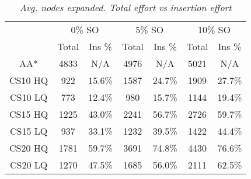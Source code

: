 \begin{table}[ht]
\caption{\small{\emph{Avg. nodes expanded. Total effort vs insertion effort}}}
\label{aha-table:searcheffort}
\begin{center}
\begin{tabular*}{0.48\textwidth}{@{\extracolsep{\fill}}ccccccc}%
  \hline
 & \multicolumn{2}{c}{\small{0\% SO}} & \multicolumn{2}{c}{\small{5\% SO}} & \multicolumn{2}{c}{\small{10\% SO}} \\
 & \small{Total} & \small{Ins \%} & \small{Total} & \small{Ins \%} & \small{Total} & \small{Ins \%} \\
  \hline
\small{AA*} & \small{4833 }& \small{N/A }& \small{4976 }& \small{N/A }& \small{5021} & \small{N/A }\\
\small{CS10 HQ }& \small{922 }& \small{15.6\%} & \small{1587} & \small{24.7\% }& \small{1909 }& \small{27.7\% }\\
\small{CS10 LQ }& \small{773 }& \small{12.4\% }& \small{980 }& \small{15.7\% }& \small{1144 }& \small{19.4\% }\\
\small{CS15 HQ }& \small{1225 }& \small{43.0\%} & \small{2241 }& \small{56.7\% }& \small{2726 }& \small{59.7\%} \\
\small{CS15 LQ }& \small{937 }& \small{33.1\% }& \small{1232 }& \small{39.5\% }& \small{1422} & \small{44.4\% }\\
\small{CS20 HQ }& \small{1781} & \small{59.7\% }& \small{3691 }& \small{74.8\% }& \small{4430 }& \small{76.6\% }\\
\small{CS20 LQ }& \small{1270} & \small{47.5\% }& \small{1685 }& \small{56.0\% }& \small{2111 }& \small{62.5\% }\\
   \hline
\end{tabular*}
\end{center}
\end{table}

